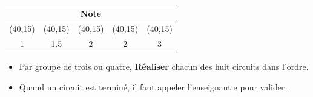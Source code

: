 \documentclass[10pt]{article}
\newcommand{\myboxtwo}{\makebox(40,15){}}
\begin{document}
	\begin{center}	
		\begin{tabular}{@{}|c|c|c|c|c|@{}} \toprule
			\multicolumn{5}{|c|}{Note} \\ \midrule
			\myboxtwo & \myboxtwo & \myboxtwo & \myboxtwo & \myboxtwo \\ \midrule
			1 & 1.5 & 2 & 2 & 3 \\ \bottomrule
		\end{tabular}
	\end{center}
\vspace{-20pt}
\vspace{-10pt}
		\begin{itemize}
			\item Par groupe de trois ou quatre, \textbf{Réaliser} chacun des huit circuits dans l'ordre.
			\item Quand un circuit est terminé, il faut appeler l'enseignant.e pour valider.
		\end{itemize}
\end{document}
